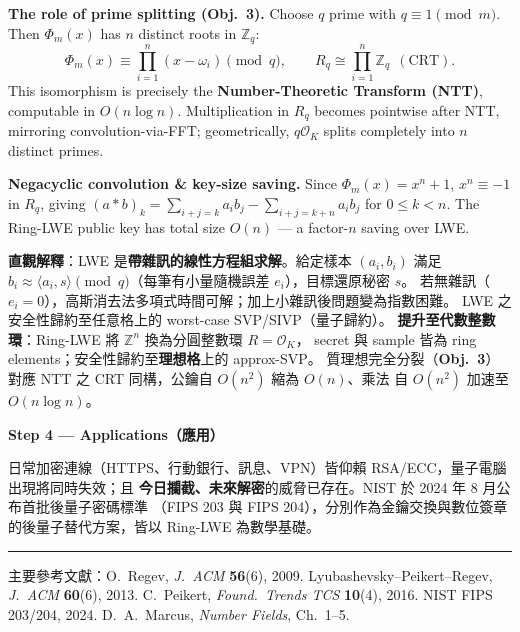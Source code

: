 \documentclass[12pt, a4paper]{article}
\begin{document}
\textbf{The role of prime splitting (Obj.\ 3).} Choose $q$ prime with $q\equiv 1\pmod m$. Then
$\Phi_m(x)$ has $n$ distinct roots in $\mathbb{Z}_q$:
\[
  \Phi_m(x)\equiv\prod_{i=1}^{n}(x-\omega_i)\pmod q,
  \qquad R_q\cong\prod_{i=1}^{n}\mathbb{Z}_q\ \ (\text{CRT}).
\]
This isomorphism is precisely the \textbf{Number-Theoretic Transform (NTT)}, computable in
$O(n\log n)$. Multiplication in $R_q$ becomes pointwise after NTT, mirroring convolution-via-FFT;
geometrically, $q\mathcal{O}_K$ splits completely into $n$ distinct primes.

\textbf{Negacyclic convolution \& key-size saving.} Since $\Phi_m(x)=x^n+1$, $x^n\equiv-1$ in
$R_q$, giving $(a*b)_k=\sum_{i+j=k}a_ib_j-\sum_{i+j=k+n}a_ib_j$ for $0\leq k<n$. The Ring-LWE
public key has total size $O(n)$ — a factor-$n$ saving over LWE.

\textbf{直觀解釋}：LWE 是\textbf{帶雜訊的線性方程組求解}。給定樣本 $(a_i,b_i)$ 滿足
$b_i\approx\langle a_i,s\rangle\pmod q$（每筆有小量隨機誤差 $e_i$），目標還原秘密 $s$。
若無雜訊（$e_i=0$），高斯消去法多項式時間可解；加上小雜訊後問題變為指數困難。
LWE 之安全性歸約至任意格上的 worst-case SVP/SIVP（量子歸約）。
\textbf{提升至代數整數環}：Ring-LWE 將 $\mathbb{Z}^n$ 換為分圓整數環 $R=\mathcal{O}_K$，
secret 與 sample 皆為 ring elements；安全性歸約至\textbf{理想格}上的 approx-SVP。
質理想完全分裂（\textbf{Obj.\ 3}）對應 NTT 之 CRT 同構，公鑰自 $O(n^2)$ 縮為 $O(n)$、乘法
自 $O(n^2)$ 加速至 $O(n\log n)$。

\medskip
\textbf{Step 4 --- Applications（應用）}

日常加密連線（HTTPS、行動銀行、訊息、VPN）皆仰賴 RSA/ECC，量子電腦出現將同時失效；且
\textbf{今日攔截、未來解密}的威脅已存在。NIST 於 2024 年 8 月公布首批後量子密碼標準
（FIPS 203 與 FIPS 204），分別作為金鑰交換與數位簽章的後量子替代方案，皆以 Ring-LWE
為數學基礎。

\vspace{12pt}
\noindent\rule{\linewidth}{0.4pt}
\begin{center}
  \small\color{gray}
  主要參考文獻：O.\ Regev, \textit{J.\ ACM} \textbf{56}(6), 2009.\quad
  Lyubashevsky--Peikert--Regev, \textit{J.\ ACM} \textbf{60}(6), 2013.\quad
  C.\ Peikert, \textit{Found.\ Trends TCS} \textbf{10}(4), 2016.\quad
  NIST FIPS 203/204, 2024.\quad
  D.\ A.\ Marcus, \textit{Number Fields}, Ch.\ 1--5.
\end{center}
\end{document}
